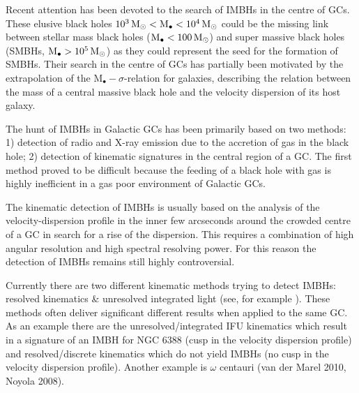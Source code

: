\par Recent attention has been devoted to the search of \acp{IMBH} in the centre of \acp{GC}. These elusive black holes \(\unit[10^3]{\mathrm{M}_\odot} < \mathrm{M}_\bullet < \unit[10^4]{\mathrm{M}_\odot}\) could be the missing link between stellar mass black holes (\(\mathrm{M}_\bullet < \unit[100]{\mathrm{M}_\odot}\)) and super massive black holes (\acsp{SMBH}, \(\mathrm{M}_\bullet > \unit[10^5]{\mathrm{M}_\odot}\)) as they could represent the seed for the formation of \acp{SMBH}. Their search in the centre of \acp{GC} has partially been motivated by the extrapolation of the \(\mathrm{M}_\bullet-\sigma\)-relation for galaxies, describing the relation between the mass of a central massive black hole and the velocity dispersion of its host galaxy.
\par The hunt of \acp{IMBH} in Galactic \acp{GC} has been primarily based on two methods: 1) detection of radio and X-ray emission due to the accretion of gas in the black hole; 2) detection of kinematic signatures in the central region of a \ac{GC}. The first method proved to be difficult because the feeding of a black hole with gas is highly inefficient in a gas poor environment of Galactic \acp{GC}. 
\par The kinematic detection of \acp{IMBH} is usually based on the analysis of the velocity-dispersion profile in the inner few arcseconds around the crowded centre of a \ac{GC} in search for a rise of the dispersion. This requires a combination of high angular resolution and high spectral resolving power. For this reason the detection of \acp{IMBH} remains still highly controversial. 
\par Currently there are two different kinematic methods trying to detect \acp{IMBH}: resolved kinematics \& unresolved integrated light (see, for example \citealt{2015MNRAS.453..365B}). These methods often deliver significant different results when applied to the same \ac{GC}. As an example there are the unresolved/integrated IFU kinematics which result in a signature of an \ac{IMBH} for NGC 6388 (cusp in the velocity dispersion profile) and resolved/discrete kinematics which do not yield \acp{IMBH} (no cusp in the velocity dispersion profile). Another example is \(\omega\) centauri (van der Marel 2010, Noyola 2008).
